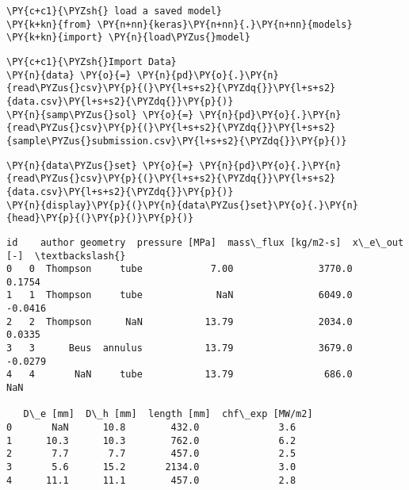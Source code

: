 \begin{tcolorbox}[breakable, size=fbox, boxrule=1pt, pad at break*=1mm,colback=cellbackground, colframe=cellborder]
\begin{Verbatim}[commandchars=\\\{\}]
\PY{c+c1}{\PYZsh{} load a saved model}
\PY{k+kn}{from} \PY{n+nn}{keras}\PY{n+nn}{.}\PY{n+nn}{models} \PY{k+kn}{import} \PY{n}{load\PYZus{}model}
\end{Verbatim}
\end{tcolorbox}

    \begin{tcolorbox}[breakable, size=fbox, boxrule=1pt, pad at break*=1mm,colback=cellbackground, colframe=cellborder]
\begin{Verbatim}[commandchars=\\\{\}]
\PY{c+c1}{\PYZsh{}Import Data}
\PY{n}{data} \PY{o}{=} \PY{n}{pd}\PY{o}{.}\PY{n}{read\PYZus{}csv}\PY{p}{(}\PY{l+s+s2}{\PYZdq{}}\PY{l+s+s2}{data.csv}\PY{l+s+s2}{\PYZdq{}}\PY{p}{)}
\PY{n}{samp\PYZus{}sol} \PY{o}{=} \PY{n}{pd}\PY{o}{.}\PY{n}{read\PYZus{}csv}\PY{p}{(}\PY{l+s+s2}{\PYZdq{}}\PY{l+s+s2}{sample\PYZus{}submission.csv}\PY{l+s+s2}{\PYZdq{}}\PY{p}{)}
\end{Verbatim}
\end{tcolorbox}

    \begin{tcolorbox}[breakable, size=fbox, boxrule=1pt, pad at break*=1mm,colback=cellbackground, colframe=cellborder]
\begin{Verbatim}[commandchars=\\\{\}]
\PY{n}{data\PYZus{}set} \PY{o}{=} \PY{n}{pd}\PY{o}{.}\PY{n}{read\PYZus{}csv}\PY{p}{(}\PY{l+s+s2}{\PYZdq{}}\PY{l+s+s2}{data.csv}\PY{l+s+s2}{\PYZdq{}}\PY{p}{)}
\PY{n}{display}\PY{p}{(}\PY{n}{data\PYZus{}set}\PY{o}{.}\PY{n}{head}\PY{p}{(}\PY{p}{)}\PY{p}{)}
\end{Verbatim}
\end{tcolorbox}

    
    \begin{Verbatim}[commandchars=\\\{\}]
   id    author geometry  pressure [MPa]  mass\_flux [kg/m2-s]  x\_e\_out [-]  \textbackslash{}
0   0  Thompson     tube            7.00               3770.0       0.1754   
1   1  Thompson     tube             NaN               6049.0      -0.0416   
2   2  Thompson      NaN           13.79               2034.0       0.0335   
3   3      Beus  annulus           13.79               3679.0      -0.0279   
4   4       NaN     tube           13.79                686.0          NaN   

   D\_e [mm]  D\_h [mm]  length [mm]  chf\_exp [MW/m2]  
0       NaN      10.8        432.0              3.6  
1      10.3      10.3        762.0              6.2  
2       7.7       7.7        457.0              2.5  
3       5.6      15.2       2134.0              3.0  
4      11.1      11.1        457.0              2.8  
    \end{Verbatim}

